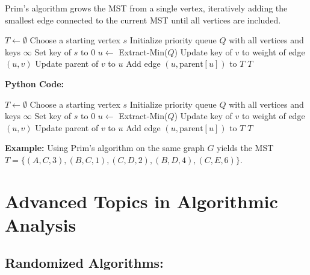 \documentclass[12pt]{book} %
\begin{document}
Prim's algorithm grows the MST from a single vertex, iteratively adding the smallest edge connected to the current MST until all vertices are included.
\FloatBarrier
\begin{algorithm}
\caption{Prim's Algorithm}
\begin{algorithmic}[1]
    \State $T \gets \emptyset$ 
    \State Choose a starting vertex $s$
    \State Initialize priority queue $Q$ with all vertices and keys $\infty$
    \State Set key of $s$ to 0
        \State $u \gets$ Extract-Min($Q$)
                \State Update key of $v$ to weight of edge $(u, v)$
                \State Update parent of $v$ to $u$
            \EndIf
        \EndFor
        \State Add edge $(u, \text{parent}[u])$ to $T$
    \EndWhile
    \State \Return $T$
\EndFunction
\end{algorithmic}
\end{algorithm}
\FloatBarrier
\textbf{Python Code:}
\FloatBarrier
\begin{algorithm}
\caption{Prim's Algorithm}
\begin{algorithmic}[1]
    \State $T \gets \emptyset$ 
    \State Choose a starting vertex $s$
    \State Initialize priority queue $Q$ with all vertices and keys $\infty$
    \State Set key of $s$ to 0
        \State $u \gets$ Extract-Min($Q$)
                \State Update key of $v$ to weight of edge $(u, v)$
                \State Update parent of $v$ to $u$
            \EndIf
        \EndFor
        \State Add edge $(u, \text{parent}[u])$ to $T$
    \EndWhile
    \State \Return $T$
\EndFunction
\end{algorithmic}
\end{algorithm}
\FloatBarrier
\textbf{Example:} Using Prim's algorithm on the same graph $G$ yields the MST $T = \{(A, C, 3), (B, C, 1), (C, D, 2), (B, D, 4), (C, E, 6)\}$.



\section{Advanced Topics in Algorithmic Analysis}
\subsection{Randomized Algorithms:}
\end{document}

